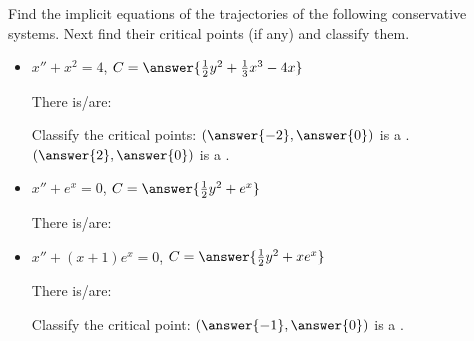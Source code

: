 \documentclass{ximera}
\begin{document}
\begin{exercise}%
    Find the implicit equations of the trajectories of the following conservative systems.  Next find their critical points (if any) and classify them.
    \begin{itemize}
        \item $x''+ x^2 = 4$, $C = \answer{\frac{1}{2}y^2 + \frac{1}{3}x^3 -4x}$
            \begin{problem}
                There is/are:
                \begin{multipleChoice}
                \end{multipleChoice}
                \begin{problem}
                    Classify the critical points:   $\left(\answer{-2}, \answer{0}\right)$ is a  .\\
                                                    $\left(\answer{2}, \answer{0}\right)$ is a  .\\
                \end{problem}
            \end{problem}
        \item $x''+ e^x = 0$, $C = \answer{\frac{1}{2}y^2 + e^x}$
            \begin{problem}
                There is/are:
                \begin{multipleChoice}
                \end{multipleChoice}
            \end{problem}
        \item $x''+ (x+1)e^x = 0$, $C = \answer{\frac{1}{2}y^2 + xe^x}$
            \begin{problem}
                There is/are:
                \begin{multipleChoice}
                \end{multipleChoice}
                \begin{problem}
                    Classify the critical point: $\left(\answer{-1}, \answer{0}\right)$ is a  .
                \end{problem}
            \end{problem}
    \end{itemize}
\end{exercise}
\end{document}
